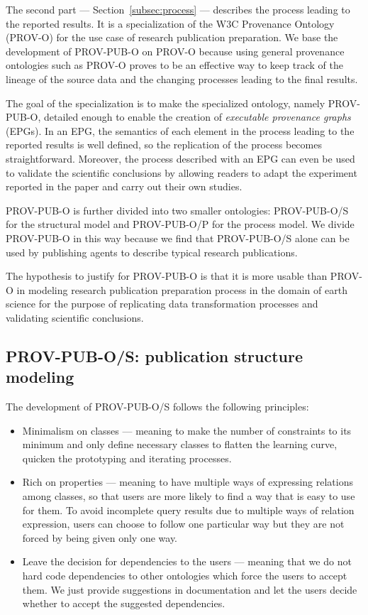 The second part --- Section~\ref{subsec:process} --- describes the process leading to the reported results. It is a specialization of the W3C Provenance Ontology (PROV-O) for the use case of research publication preparation. We base the development of PROV-PUB-O on PROV-O because using general provenance ontologies such as PROV-O proves to be an effective way to keep track of the lineage of the source data and the changing processes leading to the final results. 

The goal of the specialization is to make the specialized ontology, namely PROV-PUB-O, detailed enough to enable the creation of \emph{executable provenance graphs} (EPGs). In an EPG, the semantics of each element in the process leading to the reported results is well defined, so the replication of the process becomes straightforward. Moreover, the process described with an EPG can even be used to validate the scientific conclusions by allowing readers to adapt the experiment reported in the paper and carry out their own studies.

PROV-PUB-O is further divided into two smaller ontologies: PROV-PUB-O/S for the structural model and PROV-PUB-O/P for the process model. We divide PROV-PUB-O in this way because we find that PROV-PUB-O/S alone can be used by publishing agents to describe typical research publications. 

The hypothesis to justify for PROV-PUB-O is that it is more usable than PROV-O in modeling research publication preparation process in the domain of earth science for the purpose of replicating data transformation processes and validating scientific conclusions.

\subsection{PROV-PUB-O/S: publication structure modeling}
\label{subsec:structure}

The development of PROV-PUB-O/S follows the following principles:
\begin{itemize}
	\item Minimalism on classes --- meaning to make the number of constraints to its minimum and only define necessary classes to flatten the learning curve, quicken the prototyping and iterating processes.
	\item Rich on properties --- meaning to have multiple ways of expressing relations among classes, so that users are more likely to find a way that is easy to use for them. To avoid incomplete query results due to multiple ways of relation expression, users can choose to follow one particular way but they are not forced by being given only one way.
	\item Leave the decision for dependencies to the users --- meaning that we do not hard code dependencies to other ontologies which force the users to accept them. We just provide suggestions in documentation and let the users decide whether to accept the suggested dependencies.
\end{itemize}

